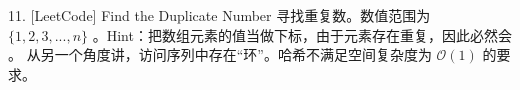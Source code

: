 \documentclass[letterpaper,10pt,english]{sphinxmanual}
\begin{document}
\begin{quote}
\begin{sphinxVerbatim}[commandchars=\\\{\},numbers=left,firstnumber=1,stepnumber=1]
               
         
\end{sphinxVerbatim}
\end{quote}

11. {[}LeetCode{]} Find the Duplicate Number 寻找重复数。数值范围为 \(\{ 1,2,3,...,n \}\) 。Hint：把数组元素的值当做下标，由于元素存在重复，因此必然会  。
从另一个角度讲，访问序列中存在“环”。哈希不满足空间复杂度为 \(\mathcal{O}(1)\) 的要求。
\end{document}
